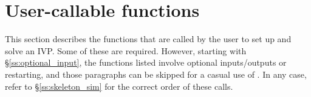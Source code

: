 \section{User-callable functions}
\label{ss:cvode_fct_sim}

This section describes the {\cvode} functions that are called by the user to set up 
and solve an IVP. Some of these are required. However, starting with \S\ref{ss:optional_input},
the functions listed involve optional inputs/outputs or restarting, and those paragraphs can 
be skipped for a casual use of {\cvode}. In any case, refer to \S\ref{ss:skeleton_sim} for
the correct order of these calls.

